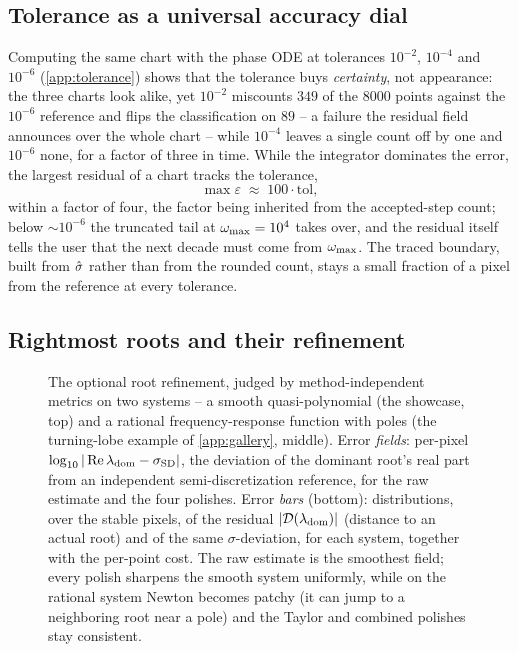 \subsection{Tolerance as a universal accuracy dial}\label{sec:showcase-tolerance}

Computing the same chart with the phase ODE at tolerances $10^{-2}$, $10^{-4}$
and $10^{-6}$ (\ref{app:tolerance}) shows that the tolerance buys
\emph{certainty}, not appearance: the three charts look alike, yet $10^{-2}$
miscounts $349$ of the $8000$ points against the $10^{-6}$ reference and flips
the classification on $89$ -- a failure the residual field announces over the
whole chart -- while $10^{-4}$ leaves a single count off by one and $10^{-6}$
none, for a factor of three in time. While the integrator dominates the error,
the largest residual of a chart tracks the tolerance,
\begin{equation}\label{eq:rule}
  \max\varepsilon \;\approx\; 100 \cdot \mathrm{tol},
\end{equation}
within a factor of four, the factor being inherited from the accepted-step
count; below $\sim10^{-6}$ the truncated tail at $\omega_{\mathrm{max}}=10^{4}$ takes over, and
the residual itself tells the user that the next decade must come from $\omega_{\mathrm{max}}$.
The traced boundary, built from $\hat{\sigma}$ rather than from the rounded count,
stays a small fraction of a pixel from the reference at every tolerance.

\subsection{Rightmost roots and their refinement}\label{sec:showcase-roots}

\begin{figure}[tb]
  \centering
  \caption{The optional root refinement, judged by method-independent metrics
  on two systems -- a smooth quasi-polynomial (the showcase, top) and a
  rational frequency-response function with poles (the turning-lobe example of
  \ref{app:gallery}, middle). Error \emph{fields}: per-pixel
  $\log_{10}|\operatorname{Re}\lambda_{\mathrm{dom}}-\sigma_{\mathrm{SD}}|$, the deviation of
  the dominant root's real part from an independent semi-discretization
  reference, for the raw estimate and the four polishes. Error \emph{bars}
  (bottom): distributions, over the stable pixels, of the residual
  $|\mathcal{D}(\lambda_{\mathrm{dom}})|$ (distance to an actual root) and of the same
  $\sigma$-deviation, for each system, together with the per-point cost. The
  raw estimate is the smoothest field; every polish sharpens the smooth
  system uniformly, while on the rational system Newton becomes patchy (it can
  jump to a neighboring root near a pole) and the Taylor and combined polishes
  stay consistent.}\label{fig:refinement}
\end{figure}

